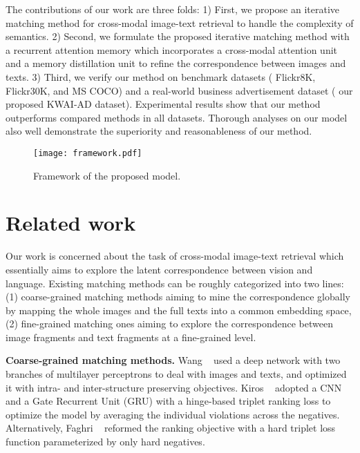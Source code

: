 \documentclass[10pt,twocolumn,letterpaper]{article}
\newcommand{\Ads}{KWAI-AD}
\begin{document}
The contributions of our work are three folds: 1) First, we propose an iterative matching method for cross-modal image-text retrieval to handle the complexity of semantics. 2) Second, we formulate the proposed iterative matching method with a recurrent attention memory which incorporates a cross-modal attention unit and a memory distillation unit to refine the correspondence between images and texts. 3) Third, we verify our method on benchmark datasets (\ie{} Flickr8K, Flickr30K, and MS COCO) and a real-world business advertisement dataset (\ie{} our proposed \Ads{} dataset). Experimental results show that our method outperforms compared methods in all datasets. Thorough analyses on our model also well demonstrate the superiority and reasonableness of our method.

\begin{figure*}[!t] \centering
  \texttt{[image: framework.pdf]}
  \caption{Framework of the proposed model.}
  \label{fig:framework}
\end{figure*}

\section{Related work}
Our work is concerned about the task of cross-modal image-text retrieval which essentially aims to explore the latent correspondence between vision and language. Existing matching methods can be roughly categorized into two lines: (1) coarse-grained matching methods aiming to mine the correspondence globally by mapping the whole images and the full texts into a common embedding space, (2) fine-grained matching ones aiming to explore the correspondence between image fragments and text fragments at a fine-grained level.



\textbf{Coarse-grained matching methods.} Wang \etal{}~\cite{wang2016learning} used a deep network with two branches of multilayer perceptrons to deal with images and texts, and optimized it with intra- and inter-structure preserving objectives. Kiros \etal{}~\cite{kiros2014unifying} adopted a CNN and a Gate Recurrent Unit (GRU) with a hinge-based triplet ranking loss to optimize the model by averaging the individual violations across the negatives. Alternatively, Faghri \etal{}~\cite{faghri2017vse++} reformed the ranking objective with a hard triplet loss function parameterized by only hard negatives.
\end{document}
